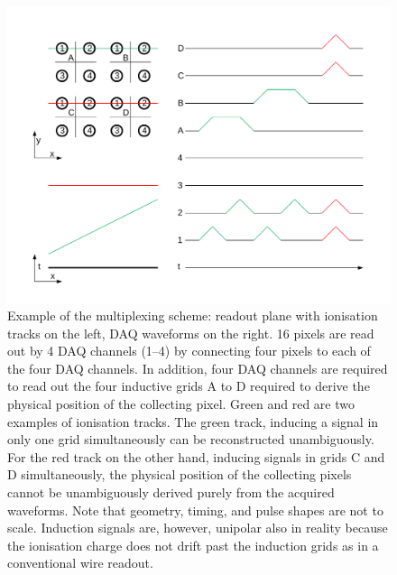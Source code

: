 \documentclass[instruments,article,submit,moreauthors,pdftex]{Definitions/mdpi}
\begin{document}
\begin{figure}[htb]
	\centering
	\includegraphics[width=\textwidth]{Figures/mux}
	\caption{Example of the multiplexing scheme: readout plane with ionisation tracks on the left, DAQ waveforms on the right. 16 pixels are read out by 4 DAQ channels (\numrange{1}{4}) by connecting four pixels to each of the four DAQ channels. In addition, four DAQ channels are required to read out the four inductive grids A to D required to derive the physical position of the collecting pixel. Green and red are two examples of ionisation tracks. The green track, inducing a signal in only one grid simultaneously can be reconstructed unambiguously. For the red track on the other hand, inducing signals in grids C and D simultaneously, the physical position of the collecting pixels cannot be unambiguously derived purely from the acquired waveforms. Note that geometry, timing, and pulse shapes are not to scale. Induction signals are, however, unipolar also in reality because the ionisation charge does not drift past the induction grids as in a conventional wire readout.}
	\label{fig:mux}
\end{figure}
\end{document}
